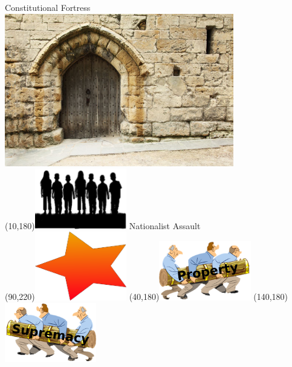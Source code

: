 \begin{frame}{Constitutional Fortress}
    \centering
    \includegraphics[width=0.75\textwidth]{img/fortress.png} \\
    \Put(10,180){\includegraphics[width=0.3\textwidth]{img/family.png}}
    { \color{red} \huge{Nationalist Assault} \\}
    \Put(90,220){\includegraphics[width=0.3\textwidth]{img/blam.png}}
    \Put(40,180){\includegraphics[width=0.3\textwidth]{img/property-ram.png}}
    \Put(140,180){\includegraphics[width=0.3\textwidth]{img/supremacy-ram.png}}
\end{frame}

